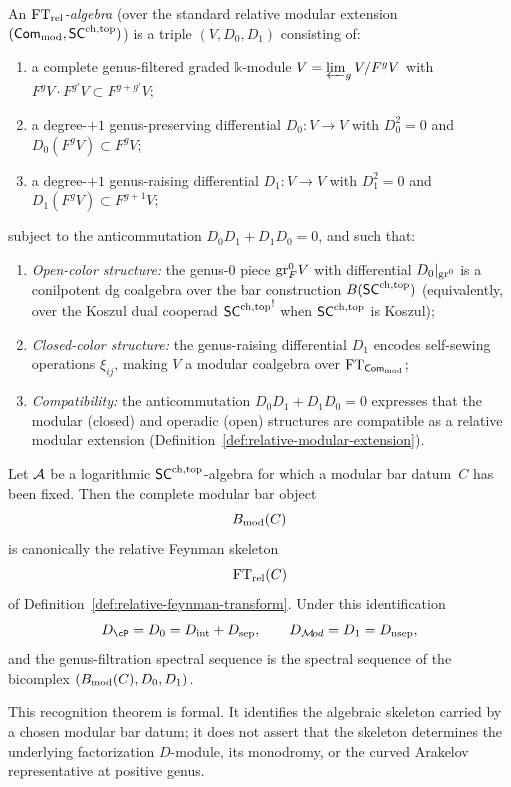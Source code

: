 \begin{definition}
\label{def:ft-rel-algebra}
An \emph{$\mathrm{FT}_{\mathrm{rel}}$-algebra} (over the standard
relative modular extension
$(\mathsf{Com}_{\mathrm{mod}}, \mathsf{SC}^{\mathrm{ch,top}})$) is a triple
$(V, D_0, D_1)$ consisting of:
\begin{enumerate}[label=\textup{(\roman*)}]
\item a complete genus-filtered graded $\mathbb{k}$-module
 $V = \varprojlim_g V/F^g V$ with
 $F^g V \cdot F^{g'} V \subset F^{g+g'} V$;
\item a degree-$+1$ genus-preserving differential
 $D_0 \colon V \to V$ with $D_0^2 = 0$ and
 $D_0(F^g V) \subset F^g V$;
\item a degree-$+1$ genus-raising differential
 $D_1 \colon V \to V$ with $D_1^2 = 0$ and
 $D_1(F^g V) \subset F^{g+1} V$;
\end{enumerate}
subject to the anticommutation $D_0 D_1 + D_1 D_0 = 0$, and
such that:
\begin{enumerate}[label=\textup{(\alph*)}]
\item \emph{Open-color structure:} the genus-$0$ piece
 $\mathrm{gr}_F^0 V$ with differential $D_0|_{\mathrm{gr}^0}$ is a
 conilpotent dg coalgebra over the bar construction
 $B(\mathsf{SC}^{\mathrm{ch,top}})$ (equivalently, over the Koszul dual
 cooperad ${\mathsf{SC}^{\mathrm{ch,top}}}^{!}$ when $\mathsf{SC}^{\mathrm{ch,top}}$
 is Koszul);
\item \emph{Closed-color structure:} the genus-raising
 differential $D_1$ encodes self-sewing operations
 $\xi_{ij}$, making $V$ a modular coalgebra over
 $\mathrm{FT}_{\mathsf{Com}_{\mathrm{mod}}}$;
\item \emph{Compatibility:} the anticommutation
 $D_0 D_1 + D_1 D_0 = 0$ expresses that the modular
 (closed) and operadic (open) structures are compatible as
 a relative modular extension
 (Definition~\ref{def:relative-modular-extension}).
\end{enumerate}
\end{definition}

\begin{theorem}
\label{thm:recognition-relative-ft}
Let $\mathcal{A}$ be a logarithmic $\mathsf{SC}^{\mathrm{ch,top}}$-algebra for which a
modular bar datum~$C$ has been fixed. Then the complete modular
bar object
\[
B_{\mathrm{mod}}(C)
\]
is canonically the relative Feynman skeleton
\[
\mathrm{FT}_{\mathrm{rel}}(C)
\]
of Definition~\ref{def:relative-feynman-transform}. Under this
identification
\[
D_\cP=D_0=D_{\mathrm{int}}+D_{\mathrm{sep}},
\qquad
D_{\cM\!od}=D_1=D_{\mathrm{nsep}},
\]
and the genus-filtration spectral sequence is the spectral
sequence of the bicomplex $(B_{\mathrm{mod}}(C),D_0,D_1)$.

This recognition theorem is formal. It identifies the algebraic
skeleton carried by a chosen modular bar datum; it does not assert
that the skeleton determines the underlying factorization
$D$-module, its monodromy, or the curved Arakelov representative
at positive genus.
\end{theorem}

